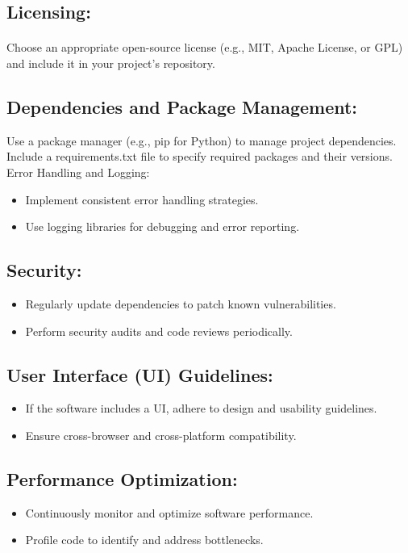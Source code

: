 \documentclass{article}
\begin{document}
\subsection{Licensing:}
\paragraph{}
Choose an appropriate open-source license (e.g., MIT, Apache License, or GPL) and
include it in your project's repository.

\subsection{Dependencies and Package Management:}
Use a package manager (e.g., pip for Python) to manage project dependencies.
Include a requirements.txt file to specify required packages and their versions.
Error Handling and Logging:
\begin{itemize}
    \item Implement consistent error handling strategies.
    \item Use logging libraries for debugging and error reporting.
\end{itemize}

\subsection{Security:}
\begin{itemize}
    \item Regularly update dependencies to patch known vulnerabilities.
    \item Perform security audits and code reviews periodically.
\end{itemize}

\subsection{User Interface (UI) Guidelines:}
\begin{itemize}
    \item If the software includes a UI, adhere to design and usability guidelines.
    \item Ensure cross-browser and cross-platform compatibility.
\end{itemize}

\subsection{Performance Optimization:}
\begin{itemize}
    \item Continuously monitor and optimize software performance.
    \item Profile code to identify and address bottlenecks.
\end{itemize}
\end{document}
